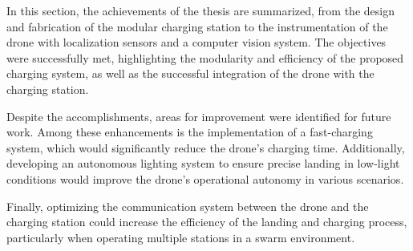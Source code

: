 In this section, the achievements of the thesis are summarized, from the design and fabrication of the modular charging station to the instrumentation of the drone with localization sensors and a computer vision system. The objectives were successfully met, highlighting the modularity and efficiency of the proposed charging system, as well as the successful integration of the drone with the charging station.

Despite the accomplishments, areas for improvement were identified for future work. Among these enhancements is the implementation of a fast-charging system, which would significantly reduce the drone's charging time. Additionally, developing an autonomous lighting system to ensure precise landing in low-light conditions would improve the drone's operational autonomy in various scenarios.

Finally, optimizing the communication system between the drone and the charging station could increase the efficiency of the landing and charging process, particularly when operating multiple stations in a swarm environment.
